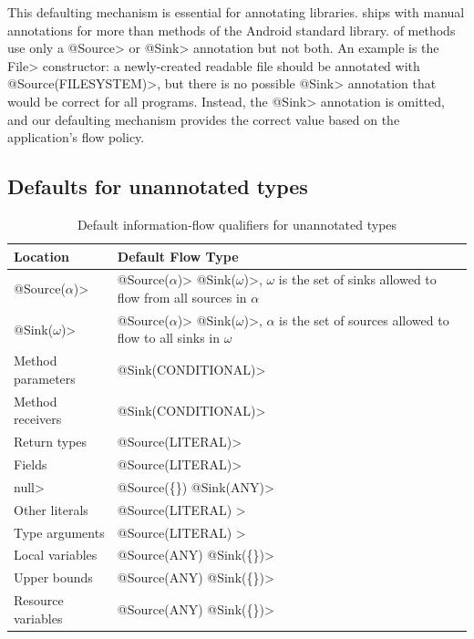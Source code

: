 This defaulting mechanism is essential for annotating
libraries.  \TheFlowChecker ships with manual annotations for more than
\FCnumstubmethodsrounded methods of the Android standard library.
\FCpercentstubmethodswithone of methods use only a
\<@Source> or \<@Sink> annotation but not both.
An example is the \<File> constructor:
a newly-created readable file should be annotated with
\<@Source(FILESYSTEM)>, but there is no possible \<@Sink> annotation
that would be correct for all programs.
Instead, the \<@Sink> annotation is omitted, and
our defaulting mechanism provides the correct value
based on the application's flow policy.



\subsection{Defaults for unannotated types}
\label{sec:unannotated-types}


\begin{table}
  \caption{Default information-flow qualifiers for unannotated types}
  \begin{tabular}{l l}
  \hline
    \bf{Location} & \bf{Default Flow Type}\\
  \hline
     \<@Source($\alpha$)>&\<@Source($\alpha$)>
       \<@Sink($\omega$)>,  $\omega$ is the set of  sinks allowed to flow from all sources in $\alpha$ \\
     \<@Sink($\omega$)>&\<@Source($\alpha$)>
       \<@Sink($\omega$)>, $\alpha$ is the set of  sources allowed to flow to all sinks in $\omega$ \\
    Method parameters &  \<@Sink(CONDITIONAL)> \\
    Method receivers &  \<@Sink(CONDITIONAL)> \\
    Return types &  \<@Source(LITERAL)> \\
    Fields &  \<@Source(LITERAL)> \\
    \<null> &  \<@Source(\{\}) @Sink(ANY)>\\
    Other literals & \<@Source(LITERAL) >\\
    Type arguments & \<@Source(LITERAL) >\\
    Local variables &   \<@Source(ANY) @Sink(\{\})> \\
    Upper bounds &   \<@Source(ANY) @Sink(\{\})> \\
    Resource variables  &   \<@Source(ANY) @Sink(\{\})> \\
  
  \end{tabular}

  \label{tab:defaults}
\end{table}

